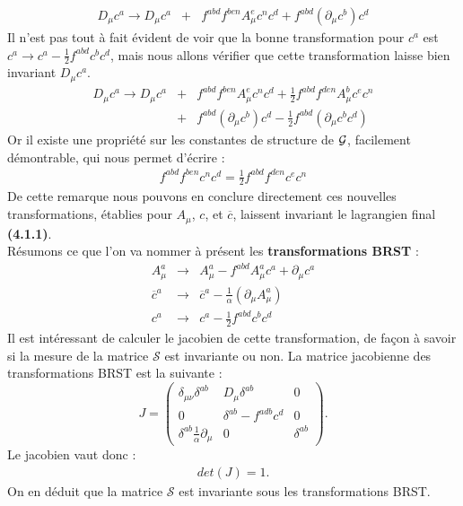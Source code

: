 \documentclass[a4paper,11pt]{article} %
\theoremstyle{plain}
\theoremstyle{definition}
\theoremstyle{remark}
\numberwithin{equation}{section}
\numberwithin{equation}{subsection}
\numberwithin{figure}{section}
\begin{document}
\begin{eqnarray*}
 D_{\mu}c^{a}  \rightarrow  D_{\mu}c^{a} &+& f^{abd} f^{ben} A^{e}_{\mu} c^{n} c^{d}  +  f^{abd} \left(  \partial_{\mu} c^{b} \right) c^{d}  
\end{eqnarray*}
Il n'est pas tout à fait évident de voir que la bonne transformation pour $c^{a}$  est  $c^{a} \rightarrow c^{a} - \frac{1}{2} f^{abd} c^{b} c^{d} $, 
mais nous allons vérifier que cette transformation laisse bien invariant $D_{\mu}c^{a}$.
\begin{eqnarray*}
 D_{\mu}c^{a}  \rightarrow  D_{\mu}c^{a} &+& f^{abd} f^{ben} A^{e}_{\mu} c^{n} c^{d}  
+  \frac{1}{2} f^{abd} f^{den} A^{b}_{\mu} c^{e} c^{n}  \nonumber \\
                                         &+& f^{abd} \left(  \partial_{\mu} c^{b} \right) c^{d}  
- \frac{1}{2}  f^{abd}  \left( \partial_{\mu} c^{b} c^{d} \right)  
\end{eqnarray*}
Or il existe une propriété sur les constantes de structure de $\cal{G}$, facilement démontrable, qui nous permet d'écrire :
\begin{eqnarray*}
 f^{abd} f^{ben} c^{n} c^{d}  = \frac{1}{2} f^{abd} f^{den} c^{e} c^{n}
\end{eqnarray*}
De cette remarque nous pouvons en conclure directement ces nouvelles transformations, établies pour $A_{\mu}$, $c$, et $\overline{c}$, laissent 
invariant le lagrangien final \textbf{(4.1.1)}.\\
Résumons ce que l'on va nommer à présent les \textbf{transformations BRST} :
\begin{eqnarray*}
 A^{a}_{\mu}    &\rightarrow&    A^{a}_{\mu} - f^{abd} A^{a}_{\mu} c^{a} + \partial_{\mu}c^{a} \\
 \overline{c}^{a} &\rightarrow& \overline{c}^{a} - \frac{1}{\alpha} \left( \partial_{\mu} A^{a}_{\mu} \right) \\
c^{a} &\rightarrow& c^{a} - \frac{1}{2} f^{abd} c^{b} c^{d}
\end{eqnarray*}
Il est intéressant de calculer le jacobien de cette transformation, de façon à savoir si la mesure de la matrice $\mathcal{S}$ est invariante ou non.
La matrice jacobienne des transformations BRST est la suivante :
\begin{equation*}
J= \left(
 \begin{array}{lcr}
    \delta_{\mu \nu} \delta^{ab}                     & D_{\mu} \delta^{ab}              & 0   \\
    0                                                & \delta^{ab} - f^{adb} c^{d}      & 0   \\
    \delta^{ab} \frac{1}{\alpha}\partial_{\mu}       & 0                                 &\delta^{ab}  
 \end{array} \right).
\end{equation*}
Le jacobien vaut donc :
\begin{eqnarray*}
 det \left( J \right) = 1.
\end{eqnarray*}
On en déduit que la matrice $\mathcal{S}$ est invariante sous les transformations BRST.
\end{document}
